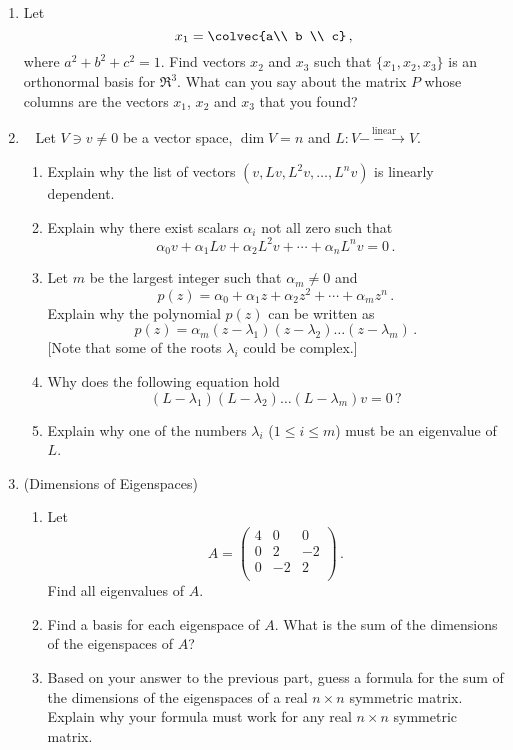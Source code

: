 \begin{enumerate}


\item Let \[x_1=\colvec{a\\ b \\ c}\, ,\] where $a^2+b^2+c^2=1$.  Find vectors $x_2$ and $x_3$ such that $\{x_1,x_2,x_3\}$ is an orthonormal basis for $\Re^3$. What can you say about the matrix $P$ whose columns are the vectors $x_1$, $x_2$ and $x_3$ that you found?

\item~\label{atleastone} Let $V\ni v\neq0$ be a vector space, $\dim V=n$ and $L:V\stackrel{\textrm{linear}}{-\!\!-\!\!\!\longrightarrow}V$.
\begin{enumerate}
\item Explain why the list of vectors $(v,Lv,L^2v,\ldots,L^n v)$ is linearly dependent.
\item Explain why there exist scalars $\alpha_i$ not all zero such that
\[
\alpha_0 v + \alpha_1 L v+\alpha_2 L^2 v+\cdots + \alpha_n L^n v=0\, .
\]
\item Let $m$ be the largest integer such that $\alpha_m\neq0$ and \[p(z)=\alpha_0+ \alpha_1 z + \alpha_2 z^2+\cdots + \alpha_m z^n \, .\]
Explain why the polynomial $p(z)$ can be written as
\[
p(z)=\alpha_m (z-\lambda_1)(z-\lambda_2)\ldots(z-\lambda_{m})\, .
\]
[Note that some of the roots $\lambda_i$ could be complex.]
\item Why does the following equation hold
\[
(L-\lambda_1)(L-\lambda_2)\ldots(L-\lambda_{m})
 v=0\, ?
\]
\item Explain why one of the numbers $\lambda_i$ ($1\leq i\leq m$) must be an eigenvalue of $L$.
\end{enumerate}




\item (Dimensions of Eigenspaces) \begin{enumerate}
\item Let \[A=
\begin{pmatrix}
4 & 0 & 0 \\
0 & 2 & -2 \\
0 & -2 & 2 \\
\end{pmatrix}\, .\]
Find all eigenvalues of \(A.\)
\item Find a basis for each eigenspace of \(A.\)  What is the sum of the dimensions of the eigenspaces of \(A\)?
\item Based on your answer to the previous part, guess a formula for the sum of the dimensions of the eigenspaces of a real \(n \times n\) symmetric matrix. Explain why your formula must work for any real \(n \times n\) symmetric matrix.
\end{enumerate}





\end{enumerate}
